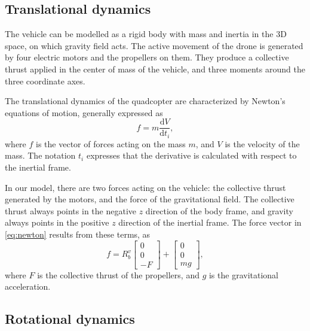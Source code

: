 \subsection{Translational dynamics}\label{sec:trans}

The vehicle can be modelled as a rigid body with mass and inertia in the 3D space, on which gravity field acts. The active movement of the drone is generated by  four electric motors and the propellers on them. They produce a collective thrust applied in the center of mass of the vehicle, and three moments around the three coordinate axes.

The translational dynamics of the quadcopter are characterized by Newton's equations of motion, generally expressed as
\begin{equation}\label{eq:newton}
f= m\frac{\mathrm{d} V}{\mathrm{d} t_i},
\end{equation}
where $f$ is the vector of forces acting on the mass $m$, and $V$ is the velocity of the mass. The notation $t_i$ expresses that the derivative is calculated with respect to the inertial frame.

In our model, there are two forces acting on the vehicle: the collective thrust generated by the motors, and the force of the gravitational field. The collective thrust always points in the negative $z$ direction of the body frame, and gravity always points in the positive $z$ direction of the inertial frame. The force vector in \eqref{eq:newton} results from these terms, as
\begin{equation}\label{eq:newtoneq}
f = R_b^v\begin{bmatrix} 0\\0\\-F \end{bmatrix} + \begin{bmatrix} 0\\0\\mg \end{bmatrix},
\end{equation}
where $F$ is the collective thrust of the propellers, and $g$ is the gravitational acceleration.

\subsection{Rotational dynamics} \label{sec:rotation}

